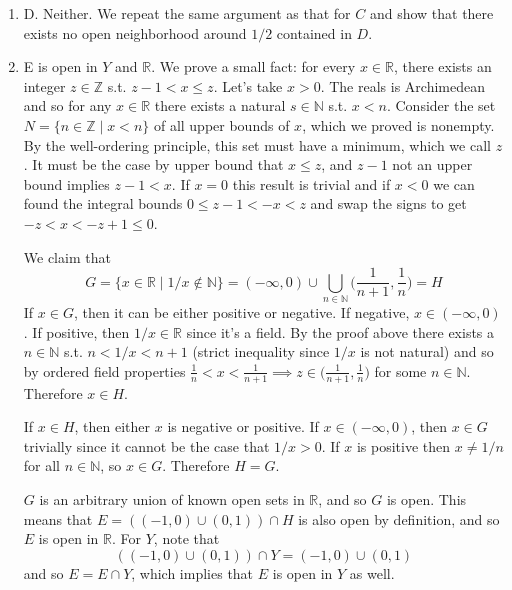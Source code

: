 \begin{solution}[Munkres 16.3]
\begin{enumerate}
      \item D. Neither. We repeat the same argument as that for $C$ and show that there exists no open neighborhood around $1/2$ contained in $D$. 

      \item E is open in $Y$ and $\mathbb{R}$. We prove a small fact: for every $x \in \mathbb{R}$, there exists an integer $z \in \mathbb{Z}$ s.t. $z - 1 < x \leq z$. Let's take $x > 0$. The reals is Archimedean and so for any $x \in \mathbb{R}$ there exists a natural $s \in \mathbb{N}$ s.t. $x < n$. Consider the set $N = \{n \in \mathbb{Z} \mid x < n\}$ of all upper bounds of $x$, which we proved is nonempty. By the well-ordering principle, this set must have a minimum, which we call $z$. It must be the case by upper bound that $x \leq z$, and $z-1$ not an upper bound implies $z-1 < x$. If $x = 0$ this result is trivial and if $x < 0$ we can found the integral bounds $0 \leq z - 1 < -x < z$ and swap the signs to get $-z < x < -z + 1 \leq 0$. 

      We claim that 
      \begin{equation}
        G = \{ x \in \mathbb{R} \mid 1/x \not\in \mathbb{N} \} = (-\infty, 0) \cup \bigcup_{n \in \mathbb{N}} \bigg( \frac{1}{n+1}, \frac{1}{n} \bigg) = H
      \end{equation} 
      If $x \in G$, then it can be either positive or negative. If negative, $x \in (-\infty, 0)$. If positive, then $1/x \in \mathbb{R}$ since it's a field. By the proof above there exists a $n \in \mathbb{N}$ s.t. $n < 1/x < n+1$ (strict inequality since $1/x$ is not natural) and so by ordered field properties $\frac{1}{n} < x < \frac{1}{n+1} \implies z \in \big( \frac{1}{n+1}, \frac{1}{n} \big)$ for some $n \in \mathbb{N}$. Therefore $x \in H$. 

      If $x \in H$, then either $x$ is negative or positive. If $x \in (-\infty, 0)$, then $x \in G$ trivially since it cannot be the case that $1/x > 0$. If $x$ is positive then $x \neq 1/n$ for all $n \in \mathbb{N}$, so $x \in G$. Therefore $H = G$. 

      $G$ is an arbitrary union of known open sets in $\mathbb{R}$, and so $G$ is open. This means that $E = ((-1, 0) \cup (0, 1)) \cap H$ is also open by definition, and so $E$ is open in $\mathbb{R}$. For $Y$, note that 
      \begin{equation}
        ((-1, 0) \cup (0, 1)) \cap Y = (-1, 0) \cup (0, 1)
      \end{equation}
      and so $E = E \cap Y$, which implies that $E$ is open in $Y$ as well. 
    \end{enumerate}
  \end{solution}

